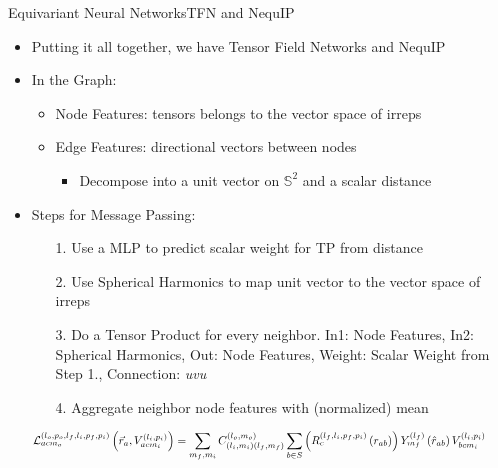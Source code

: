 \documentclass[pdf,serif]{beamer}
\newcommand{\empr}[1]{{\color{BerkeleyBlue}\emph{#1}}}
\begin{document}
\begin{frame}{Equivariant Neural Networks}{TFN and NequIP}
    \small
    \begin{itemize}
        \item Putting it all together, we have Tensor Field Networks \citep{thomas2018tensor} and NequIP \citep{batzner20223}
        \item In the Graph:
        \begin{itemize}
            \item Node Features: tensors belongs to the vector space of irreps
            \item Edge Features: directional vectors between nodes
            \begin{itemize}
                \item Decompose into a unit vector on $\mathbb S^2$ and a scalar distance
            \end{itemize}
        \end{itemize}
        \item Steps for Message Passing:
        \begin{itemize}
            \item[1.] Use a MLP to predict scalar weight for TP from distance
            \item[2.] Use Spherical Harmonics to map unit vector to the vector space of irreps
            \item[3.] Do a Tensor Product for every neighbor. In1: Node Features, In2: Spherical Harmonics, Out: Node Features, Weight: Scalar Weight from Step 1., Connection: \empr{uvu}
            \item[4.] Aggregate neighbor node features with (normalized) mean
        \end{itemize} 
    \end{itemize}
    $$\scalebox{0.8}{$\displaystyle
    \mathcal{L}_{a c m_o}^{\left(l_o, p_o, l_f, l_i, p_f, p_i\right)}\left(\vec{r}_a, V_{a c m_i}^{\left(l_i, p_i\right)}\right)=\sum_{m_f, m_i} C_{\left(l_i, m_i\right)\left(l_f, m_f\right)}^{\left(l_o, m_o\right)} \sum_{b \in S}\left(R_c^{\left(l_f, l_i, p_f, p_i\right)}\left(r_{a b}\right)\right) Y_{m_f}^{\left(l_f\right)}\left(\hat{r}_{a b}\right) V_{b c m_i}^{\left(l_i, p_i\right)}
    $}$$
\end{frame}
\end{document}

